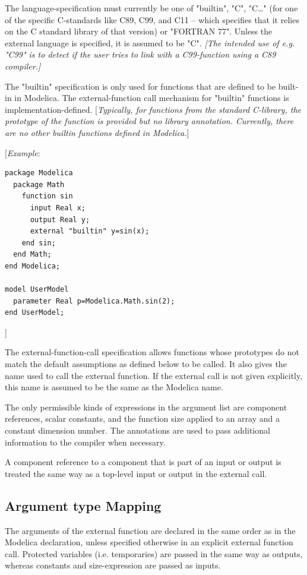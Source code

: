 \documentclass[10pt,a4paper]{report}
\def\doublelabel#1{\label{#1}\hypertarget{#1}{}}
\begin{document}
The language-specification must currently be one of "builtin", "C",
"C\ldots{}" (for one of the specific C-standards like C89, C99, and C11
-- which specifies that it relies on the C standard library of that
version) or "FORTRAN 77". Unless the external language is specified, it
is assumed to be "C". \emph{{[}The intended use of e.g. "C99" is to
detect if the user tries to link with a C99-function using a C89
compiler.{]} }

The "builtin" specification is only used for functions that are defined
to be built-in in Modelica. The external-function call mechanism for
"builtin" functions is implementation-defined. {[}\emph{Typically, for
functions from the standard C-library, the prototype of the function is
provided but no library annotation. Currently, there are no other
builtin functions defined in Modelica.}{]}

{[}\emph{Example}:

\begin{lstlisting}[language=modelica]
package Modelica
  package Math
    function sin
      input Real x;
      output Real y;
      external "builtin" y=sin(x);
    end sin;
  end Math;
end Modelica;

model UserModel
  parameter Real p=Modelica.Math.sin(2);
end UserModel;
\end{lstlisting}
{]}

The external-function-call specification allows functions whose
prototypes do not match the default assumptions as defined below to be
called. It also gives the name used to call the external function. If
the external call is not given explicitly, this name is assumed to be
the same as the Modelica name.

The only permissible kinds of expressions in the argument list are
component references, scalar constants, and the function size applied to
an array and a constant dimension number. The annotations are used to
pass additional information to the compiler when necessary.

A component reference to a component that is part of an input or output
is treated the same way as a top-level input or output in the external
call.

\subsection{Argument type Mapping}\doublelabel{argument-type-mapping}

The arguments of the external function are declared in the same order as
in the Modelica declaration, unless specified otherwise in an explicit
external function call. Protected variables (i.e. temporaries) are
passed in the same way as outputs, whereas constants and size-expression
are passed as inputs.
\end{document}

